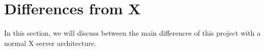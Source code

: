\section{Differences from X}
In this section, we will discuss between the main differences of this project 
with a normal X server architecture.

